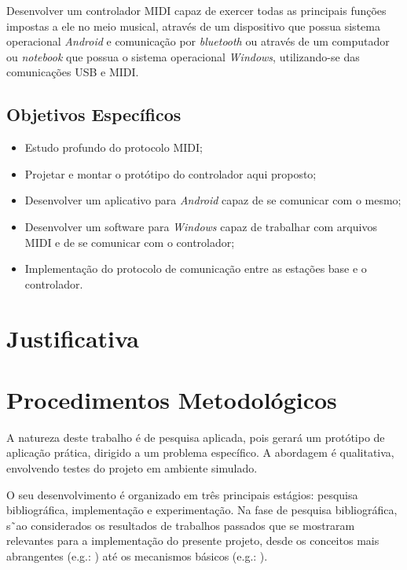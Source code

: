             Desenvolver um controlador MIDI capaz de exercer todas as principais funções impostas a ele no meio musical, através de um dispositivo que possua sistema operacional \textit{Android} e comunicação por \textit{bluetooth} ou através de um computador ou \textit{notebook} que possua o sistema operacional \textit{Windows}, utilizando-se das comunicações USB e MIDI.

        \subsection{Objetivos Específicos}

            \begin{itemize}
              \item Estudo profundo do protocolo MIDI;

              \item Projetar e montar o protótipo do controlador aqui proposto;

              \item Desenvolver um aplicativo para \textit{Android} capaz de se comunicar com o mesmo;

              \item Desenvolver um software para \textit{Windows} capaz de trabalhar com arquivos MIDI e de se comunicar com o controlador;

              \item Implementação do protocolo de comunicação entre as estações base e o controlador.
            \end{itemize}

    \section{Justificativa}



    \section{Procedimentos Metodológicos}

        A natureza deste trabalho é de pesquisa aplicada, pois gerará um protótipo de aplicação prática, dirigido a um problema específico. A abordagem é qualitativa, envolvendo testes do projeto em ambiente simulado.

        O seu desenvolvimento é organizado em três principais estágios: pesquisa bibliográfica, implementação e experimentação. Na fase de pesquisa bibliográfica, s˜ao considerados os resultados de trabalhos passados que se mostraram relevantes para a implementação do presente projeto, desde os conceitos mais abrangentes (e.g.: ) até os mecanismos básicos (e.g.: ).

